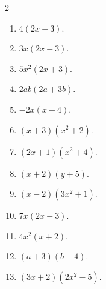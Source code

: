 \documentclass[11pt]{article}
\begin{document}
\begin{keybox}
\begin{multicols}{2}
\small
\begin{enumerate}[leftmargin=*,itemsep=3pt]
  \item $4(2x+3)$.
  \item $3x(2x-3)$.
  \item $5x^2(2x+3)$.
  \item $2ab(2a+3b)$.
  \item $-2x(x+4)$.
  \item $(x+3)(x^2+2)$.
  \item $(2x+1)(x^2+4)$.
  \item $(x+2)(y+5)$.
  \item $(x-2)(3x^2+1)$.
  \item $7x(2x-3)$.
  \item $4x^2(x+2)$.
  \item $(a+3)(b-4)$.
  \item $(3x+2)(2x^2-5)$.
\end{enumerate}
\end{multicols}
\end{keybox}
\end{document}
